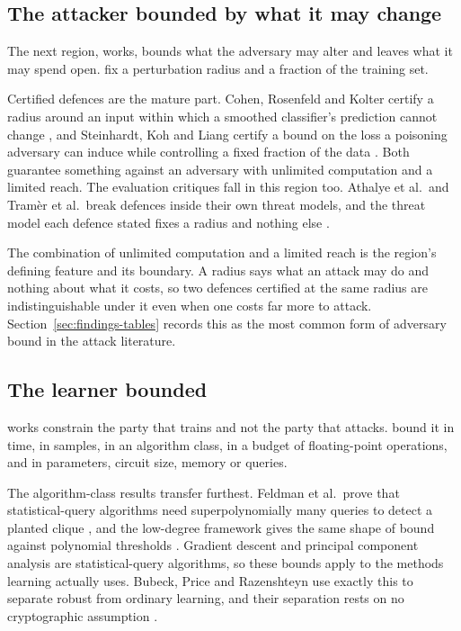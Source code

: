 \subsection{The attacker bounded by what it may change}

The next region, \AttackerCapability{} works, bounds what the adversary may
alter and leaves what it may spend open. \AttackerPerturbAll{} fix a
perturbation radius and \AttackerCorruptAll{} a fraction of the training set.

Certified defences are the mature part. Cohen, Rosenfeld and Kolter certify a
radius around an input within which a smoothed classifier's prediction cannot
change \cite{CRK19}, and Steinhardt, Koh and Liang certify a bound on the loss
a poisoning adversary can induce while controlling a fixed fraction of the
data
\cite{SKL17}. Both guarantee something against an adversary with unlimited
computation and a limited reach. The evaluation critiques fall in this region
too. Athalye et al.\ and Tram\`er et al.\ break defences inside their own
threat models, and the threat model each defence stated fixes a radius and
nothing else
\cite{ACW18,TCBM20}.

The combination of unlimited computation and a limited reach is the region's
defining feature and its boundary. A radius says what an attack may do and
nothing about what it costs, so two defences certified at the same radius are
indistinguishable under it even when one costs far more to attack.
Section~\ref{sec:findings-tables} records this as the most common form of
adversary bound in the attack literature.

\subsection{The learner bounded}

\LearnerBound{} works constrain the party that trains and not the party that
attacks. \LearnerTime{} bound it in time, \LearnerSamples{} in samples,
\LearnerClass{} in an algorithm class, \LearnerFlops{} in a budget of
floating-point operations, and \LearnerOther{} in parameters, circuit size,
memory or queries.

The algorithm-class results transfer furthest. Feldman et al.\ prove that
statistical-query algorithms need superpolynomially many queries to detect a
planted clique \cite{FGRVX17}, and the low-degree framework gives the same
shape of bound against polynomial thresholds \cite{Wei25,BBHLS21}. Gradient
descent and principal component analysis are statistical-query algorithms, so
these bounds apply to the methods learning actually uses. Bubeck, Price and
Razenshteyn use exactly this to separate robust from ordinary learning, and
their separation rests on no cryptographic assumption \cite{BPR19}.

